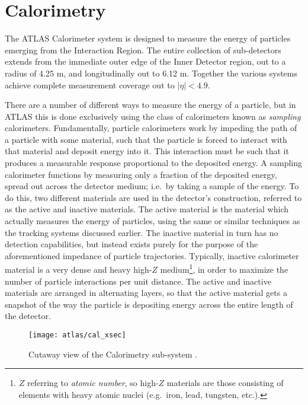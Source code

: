 \pagebreak
\section{Calorimetry} \label{sec:calorimeter}

    The ATLAS Calorimeter system is designed to measure the energy of particles emerging from the Interaction Region.
    The entire collection of sub-detectors extends from the immediate outer edge of the Inner Detector region, out to a radius of 4.25 m, and longitudinally out to 6.12 m.
    Together the various systems achieve complete measurement coverage out to $|\eta| < 4.9$.

    There are a number of different ways to measure the energy of a particle, but in ATLAS this is done exclusively using the class of calorimeters known as \textit{sampling} calorimeters.
    Fundamentally, particle calorimeters work by impeding the path of a particle with some material, such that the particle is forced to interact with that material and deposit energy into it.
    This interaction must be such that it produces a measurable response proportional to the deposited energy.
    A sampling calorimeter functions by measuring only a fraction of the deposited energy, spread out across the detector medium; i.e.\ by taking a sample of the energy.
    To do this, two different materials are used in the detector's construction, referred to as the active and inactive materials.
    The active material is the material which actually measures the energy of particles, using the same or similar techniques as the tracking systems discussed earlier.
    The inactive material in turn has no detection capabilities, but instead exists purely for the purpose of the aforementioned impedance of particle trajectories.
    Typically, inactive calorimeter material is a very dense and heavy high-$Z$ medium\footnote{
            $Z$ referring to \textit{atomic number},
                so high-$Z$ materials are those consisting of elements with heavy atomic nuclei (e.g.\ iron, lead, tungsten, etc.).
        }, in order to maximize the number of particle interactions per unit distance.
    The active and inactive materials are arranged in alternating layers, so that the active material gets a snapshot of the way the particle is depositing energy across the entire length of the detector.\cite{energy_measurement}

    \begin{figure} \centering
        \texttt{[image: atlas/cal\_xsec]}
        \caption{Cutaway view of the Calorimetry sub-system \cite{atlas_tdr}.}
        \label{fig:cal_xsec}
    \end{figure}

